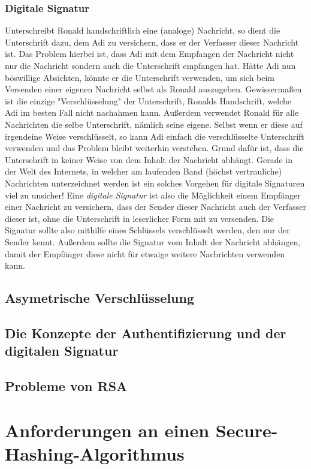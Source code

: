 \documentclass{article}
\begin{document}
	\subsubsection{Digitale Signatur}
	Unterschreibt Ronald handschriftlich eine (analoge) Nachricht, so dient die Unterschrift dazu, dem Adi zu versichern, dass er der Verfasser dieser Nachricht ist. Das Problem hierbei ist, dass Adi mit dem Empfangen der Nachricht nicht nur die Nachricht sondern auch die Unterschrift empfangen hat. Hätte Adi nun böswillige Absichten, könnte er die Unterschrift verwenden, um sich beim Versenden einer eigenen Nachricht selbst als Ronald auszugeben. Gewissermaßen ist die einzige "Verschlüsselung" der Unterschrift, Ronalds Handschrift, welche Adi im besten Fall nicht nachahmen kann. Außerdem verwendet Ronald für alle Nachrichten die selbe Unterschrift, nämlich seine eigene. Selbst wenn er diese auf irgendeine Weise verschlüsselt, so kann Adi einfach die verschlüsselte Unterschrift verwenden und das Problem bleibt weiterhin verstehen. Grund dafür ist, dass die Unterschrift in keiner Weise von dem Inhalt der Nachricht abhängt.  Gerade in der Welt des Internets, in welcher am laufenden Band (höchst vertrauliche) Nachrichten unterzeichnet werden ist ein solches Vorgehen für digitale Signaturen viel zu unsicher!
	Eine \textit{digitale Signatur} ist also die Möglichkeit einem Empfänger einer Nachricht zu versichern, dass der Sender dieser Nachricht auch der Verfasser dieser ist, ohne die Unterschrift in leserlicher Form mit zu versenden. Die Signatur sollte also mithilfe eines Schlüssels verschlüsselt werden, den nur der Sender kennt. Außerdem sollte die Signatur vom Inhalt der Nachricht abhängen, damit der Empfänger diese nicht für etwaige weitere Nachrichten verwenden kann.
	\subsection{Asymetrische Verschlüsselung}
	\subsection{Die Konzepte der Authentifizierung und der digitalen Signatur}
	\subsection{Probleme von RSA}
	\section{Anforderungen an einen Secure-Hashing-Algorithmus}
\end{document}
